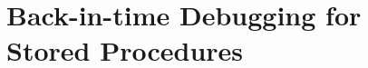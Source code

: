 \documentclass[english,conference,final]{IEEEtran}
\newcommand{\todo}[2][]{\pdfmargincomment[author={#1}]{#2}}
\begin{document}


\section{Back-in-time Debugging for\texorpdfstring{\\ }{ }Stored Procedures}
\label{sec:prototype}


\end{document}
